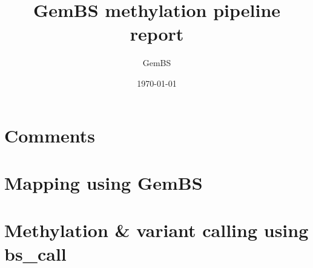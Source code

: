 \documentclass[\reportpagesize,10pt,oneside]{extras/gembsbook_default}
\title{GemBS methylation pipeline report}
\author{GemBS}
\date{\today}
\begin{document}
\maketitle
\tableofcontents
\ifdefined\comment
  \chapter{Comments}
  \parbox{\linewidth}{\raggedright\comment}
\fi
\chapter{Mapping using GemBS}

\chapter{Methylation \& variant calling using bs\_call}

\end{document}
